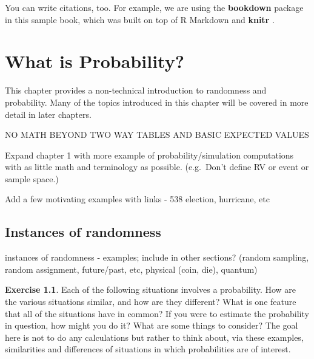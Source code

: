 \documentclass[
]{book}
\theoremstyle{definition}
\theoremstyle{definition}
\theoremstyle{definition}
\newtheorem{exercise}{Exercise}[chapter]
\theoremstyle{remark}
\begin{document}
You can write citations, too. For example, we are using the \textbf{bookdown} package \citep{R-bookdown} in this sample book, which was built on top of R Markdown and \textbf{knitr} \citep{xie2015}.

\hypertarget{prob-literacy}{%
\chapter{What is Probability?}\label{prob-literacy}}

This chapter provides a non-technical introduction to randomness and probability. Many of the topics introduced in this chapter will be covered in more detail in later chapters.

NO MATH BEYOND TWO WAY TABLES AND BASIC EXPECTED VALUES

Expand chapter 1 with more example of probability/simulation computations with as little math and terminology as possible. (e.g.~Don't define RV or event or sample space.)

Add a few motivating examples with links - 538 election, hurricane, etc

\hypertarget{randomness}{%
\section{Instances of randomness}\label{randomness}}

instances of randomness - examples; include in other sections? (random sampling, random assignment, future/past, etc, physical (coin, die), quantum)

\begin{exercise}
\protect\hypertarget{exr:randomness}{}{\label{exr:randomness} }
Each of the following situations involves a probability. How are the various situations similar, and how are they different? What is one feature that all of the situations have in common? If you were to estimate the probability in question, how might you do it? What are some things to consider? The goal here is not to do any calculations but rather to think about, via these examples, similarities and differences of situations in which probabilities are of interest.
\end{exercise}
\end{document}
